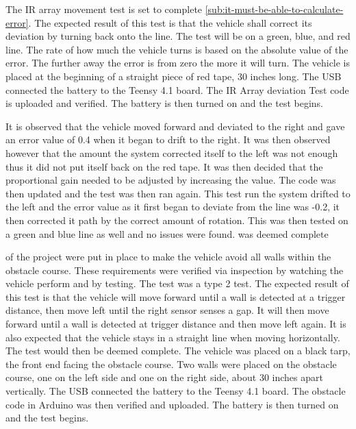 \documentclass[11pt]{report}
\begin{document}
\label{tst:ir-array-movement}
The \gls{IR} array movement test is set to complete \cref{sub:it-must-be-able-to-calculate-error}. The expected result of this test is that the vehicle shall correct its deviation by turning back onto the line. The test will be on a green, blue, and red line. The rate of how much the vehicle turns is based on the absolute value of the error. The further away the error is from zero the more it will turn. The vehicle is placed at the beginning of a straight piece of red tape, 30 inches long. The USB connected the battery to the Teensy 4.1 board. The \gls{IR} Array deviation Test code is uploaded and verified. The battery is then turned on and the test begins. 

It is observed that the vehicle moved forward and deviated to the right and gave an error value of 0.4 when it began to drift to the right. It was then observed however that the amount the system corrected itself to the left was not enough thus it did not put itself back on the red tape. It was then decided that the proportional gain needed to be adjusted by increasing the value. The code was then updated and the test was then ran again. This test run the system drifted to the left and the error value as it first began to deviate from the line was -0.2, it then corrected it path by the correct amount of rotation. This was then tested on a green and blue line as well and no issues were found.  was deemed complete


\label{tst:avoidance-of-boundaries-of-walls}
 of the project were put in place to make the vehicle avoid all walls within the obstacle course. These requirements were verified via inspection by watching the vehicle perform and by testing. The test was a type 2 test. The expected result of this test is that the vehicle will move forward until a wall is detected at a trigger distance, then move left until the right sensor senses a gap. It will then move forward until a wall is detected at trigger distance and then move left again. It is also expected that the vehicle stays in a straight line when moving horizontally. The test would then be deemed complete. The vehicle was placed on a black tarp, the front end facing the obstacle course. Two walls were placed on the obstacle course, one on the left side and one on the right side, about 30 inches apart vertically.  The USB connected the battery to the Teensy 4.1 board. The obstacle code in Arduino was then verified and uploaded. The battery is then turned on and the test begins. 
\end{document}
